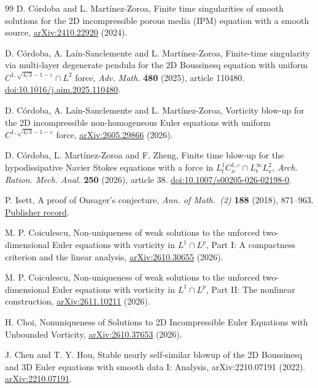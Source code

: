 \begin{thebibliography}{99}
 D. C\'ordoba and L. Mart\'inez-Zoroa,
Finite time singularities of smooth solutions for the 2D incompressible
porous media (IPM) equation with a smooth source,
\href{https://arxiv.org/abs/2410.22920}{arXiv:2410.22920} (2024).

D. C\'ordoba, A. La\'in-Sanclemente and L. Mart\'inez-Zoroa,
Finite-time singularity via multi-layer degenerate pendula for the
2D Boussinesq equation with uniform
$C^{1,\sqrt{4/3}-1-\varepsilon}\cap L^2$ force,
\emph{Adv. Math.} \textbf{480} (2025), article 110480.
\href{https://doi.org/10.1016/j.aim.2025.110480}{doi:10.1016/j.aim.2025.110480}.

D. C\'ordoba, A. La\'in-Sanclemente and L. Mart\'inez-Zoroa,
Vorticity blow-up for the 2D incompressible non-homogeneous Euler equations
with uniform $C^{1,\sqrt{4/3}-1-\varepsilon}$ force,
\href{https://arxiv.org/abs/2605.29866}{arXiv:2605.29866} (2026).

 D. C\'ordoba, L. Mart\'inez-Zoroa and F. Zheng,
Finite time blow-up for the hypodissipative Navier Stokes equations
with a force in $L_t^1 C_x^{1,\varepsilon}\cap L_t^\infty L_x^2$,
\emph{Arch. Ration. Mech. Anal.} \textbf{250} (2026), article 38.
\href{https://doi.org/10.1007/s00205-026-02198-0}{doi:10.1007/s00205-026-02198-0}.

 P. Isett, A proof of Onsager's conjecture,
\emph{Ann. of Math.~(2)} \textbf{188} (2018), 871--963.
\href{https://annals.math.princeton.edu/2018/188-3/p04}{Publisher record}.

 M. P. Coiculescu,
Non-uniqueness of weak solutions to the unforced two-dimensional Euler
equations with vorticity in $L^1\cap L^p$, Part I:
A compactness criterion and the linear analysis,
\href{https://arxiv.org/abs/2610.30655}{arXiv:2610.30655} (2026).

 M. P. Coiculescu,
Non-uniqueness of weak solutions to the unforced two-dimensional Euler
equations with vorticity in $L^1\cap L^p$, Part II:
The nonlinear construction,
\href{https://arxiv.org/abs/2611.10211}{arXiv:2611.10211} (2026).

 H. Choi,
Nonuniqueness of Solutions to 2D Incompressible Euler Equations with
Unbounded Vorticity,
\href{https://arxiv.org/abs/2610.37653}{arXiv:2610.37653} (2026).

 J. Chen and T. Y. Hou,
Stable nearly self-similar blowup of the 2D Boussinesq and 3D Euler
equations with smooth data I: Analysis,
arXiv:2210.07191 (2022).
\href{https://arxiv.org/abs/2210.07191v4}{arXiv:2210.07191}.


\end{thebibliography}

